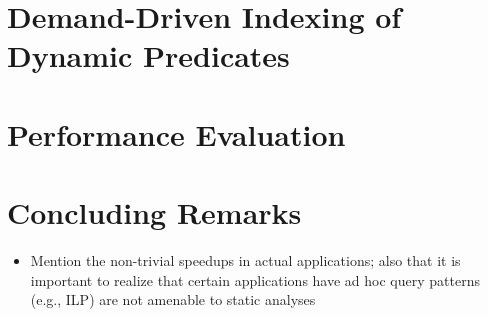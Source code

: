 \documentclass{llncs}
\begin{document}
\section{Demand-Driven Indexing of Dynamic Predicates} \label{sec:dynamic}


\section{Performance Evaluation} \label{sec:perf}


\section{Concluding Remarks}
\begin{itemize}
\item Mention the non-trivial speedups in actual applications; also
  that it is important to realize that certain applications have ad
  hoc query patterns (e.g., ILP) are not amenable to static analyses
\end{itemize}



\end{document}
